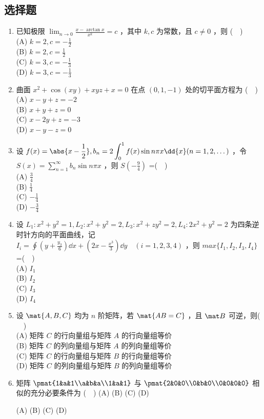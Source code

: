 
\subsection{选择题}
\begin{enumerate}
\item 已知极限 $\lim_{n\to 0}\frac{x-\arctan x}{x^k}=c$ ，其中 $k,c$ 为常数，且 $c \neq 0$ ，则 ($\quad$)\\
(A) $\displaystyle k=2,c=-\frac{1}{2}$\\
(B) $\displaystyle k=2,c=\frac{1}{2}$\\
(C) $\displaystyle k=3,c=-\frac{1}{3}$\\
(D) $\displaystyle k=3,c=-\frac{1}{3}$
\item  曲面 $x^2+\cos (xy)+xyz+x=0$ 在点 $(0,1,-1)$ 处的切平面方程为 ($\quad$)\\
(A) $x-y+z=-2$\\
(B) $x+y+z=0$\\
(C) $x-2y+z=-3$\\
(D)  $x-y-z=0$
\item  设 $\displaystyle f(x)=\abs{x-\frac{1}{2}},b_n=2\int_{0}^{1}f(x)\sin n\pi x\dd{x} (n=1,2,\dots)$ ，令 $\displaystyle S(x)=\sum_{n=1}^\infty b_n \sin n\pi x$ ，则 $S(-\frac{9}{4})$ =($\quad$)\\
(A) $\displaystyle \frac{3}{4}$\\
(B) $\displaystyle \frac{1}{4}$\\
(C) $\displaystyle -\frac{1}{4}$\\
(D)  $\displaystyle -\frac{3}{4}$
\item  设 $L_1:x^2+y^2=1,L_2:x^2+y^2=2,  L_3:x^2+zy^2=2, L_4:2x^2+y^2=2$  为四条逆时针方向的平面曲线，记 $\displaystyle I_i=\oint (y+\frac{y_3}{6})\dd{x}+(2x-\frac{x^3}{3})\dd{y}\quad (i=1,2,3,4)$  ，则 $max\{I_1,I_2,I_3,I_4\}$ =($\quad$)\\
(A) $I_1$\\
(B)  $I_2$\\
(C)  $I_3$\\
(D)  $I_4$

\item 设 $\mat {A,B,C}$ 均为 $n$ 阶矩阵，若 $\mat {AB=C}$ ，且 $\mat B$ 可逆，则($\quad$)\\
(A) 矩阵 $C$ 的行向量组与矩阵 $A$ 的行向量组等价\\
(B) 矩阵 $C$ 的列向量组与矩阵 $A$ 的列向量组等价\\
(C) 矩阵 $C$ 的行向量组与矩阵 $B$ 的行向量组等价\\
(D) 矩阵 $C$ 的列向量组与矩阵 $B$ 的列向量组等价

\item  矩阵 $\pmat{1&a&1\\a&b&a\\1&a&1}$ 与 $\pmat{2&0&0\\0&b&0\\0&0&0&0}$ 相似的充分必要条件为 ($\quad$)
(A) 
(B)
(C)
(D)

(A) 
(B)
(C)
(D)
\end{enumerate}